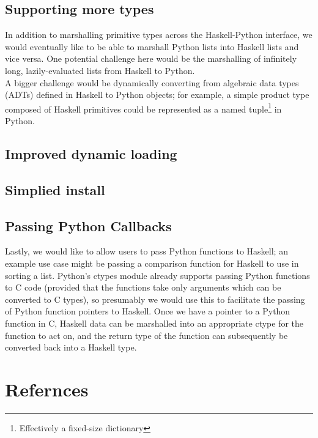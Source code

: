 \documentclass[11pt, letterpaper, oneside, twocolumn] {article}
\begin{document}

\subsection{Supporting more types}
In addition to marshalling primitive types across the Haskell-Python interface, we would eventually like to be able to marshall Python lists into Haskell lists and vice versa. One potential challenge here would be the marshalling of infinitely long, lazily-evaluated lists from Haskell to Python. \\
A bigger challenge would be dynamically converting from algebraic data types (ADTs) defined in Haskell to Python objects; for example, a simple product type composed of Haskell primitives could be represented as a named tuple\footnote{Effectively a fixed-size dictionary} in Python.

\subsection{Improved dynamic loading}


\subsection{Simplied install}


\subsection{Passing Python Callbacks}
Lastly, we would like to allow users to pass Python functions to Haskell; an example use case might be passing a comparison function for Haskell to use in sorting a list. Python's ctypes module already supports passing Python functions to C code (provided that the functions take only arguments which can be converted to C types), so presumably we would use this to facilitate the passing of Python function pointers to Haskell. Once we have a pointer to a Python function in C, Haskell data can be marshalled into an appropriate ctype for the function to act on, and the return type of the function can subsequently be converted back into a Haskell type.
\section{Refernces}

\end{document}
